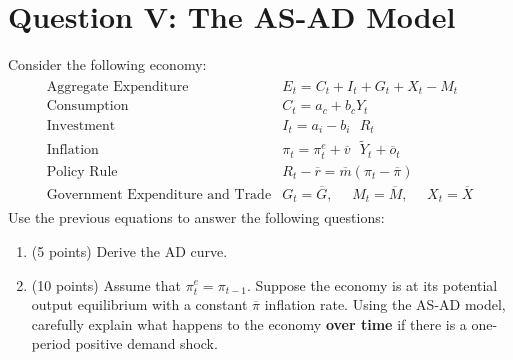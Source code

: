 \documentclass[letterpaper,12pt]{article}
\theoremstyle{dotlessS}
\begin{document}
\section*{Question V: The AS-AD Model}
Consider the following economy:
\begin{eqnarray*}
\begin{array}{ll}
\text{Aggregate Expenditure} & E_t=C_t+I_t+G_t+X_t-M_t \\[1.4ex]
\text{Consumption} & C_t=a_c+b_c Y_t \\[1.4ex]
\text{Investment} & I_t=a_i-b_i \: \: \: R_t \\[1.4ex]
\text{Inflation} & \pi_t=\pi^e_t+\overline{v} \: \: \: \widetilde{Y}_t+\overline{o}_t  \\[1.4ex]
\text{Policy Rule} & R_t-\overline{r}=\overline{m}(\pi_t-\overline{\pi})  \\[1.4ex]
\text{Government Expenditure and Trade} & G_t=\overline{G}, \: \: \: \: \: \: M_t=\overline{M}, \: \: \: \: \: \: X_t=\overline{X}
\end{array}
\end{eqnarray*}
Use the previous equations to answer the following questions:
\begin{enumerate}[label=(\alph*)]
\item (5 points) Derive the AD curve.
\item (10 points) Assume that $\pi^e_t=\pi_{t-1}$. Suppose the economy is at its potential output equilibrium with a constant $\overline{\pi}$ inflation rate. Using the AS-AD model, carefully explain what happens to the economy \textbf{over time} if there is a one-period positive demand shock.
\end{enumerate}
\end{document}
